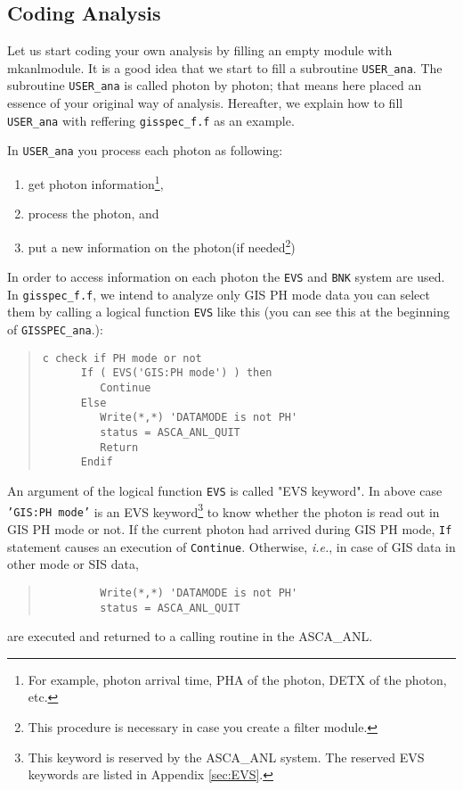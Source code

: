\subsection{Coding Analysis}
\label{sec:photon-info}
Let us start coding your own analysis
by filling an empty module with mkanlmodule.
It is a good idea
that we start to fill a subroutine {\tt USER\_ana}.
The subroutine {\tt USER\_ana} is called photon by photon;
that means here placed an essence of your original way of analysis.
Hereafter,
we explain how to fill {\tt USER\_ana}
with reffering {\tt gisspec\_f.f} as an example.

In {\tt USER\_ana}
you process each photon as following:
\begin{enumerate}
  \item get photon information\footnote{
  For example,
  photon arrival time, PHA of the photon, DETX of the photon, etc.
  },
  \item process the photon, and
  \item put a new information on the photon(if needed\footnote{
  This procedure is necessary in case you create a filter module.
  })
\end{enumerate}

In order to access information on each photon
the {\tt EVS} and {\tt BNK} system are used.
In {\tt gisspec\_f.f},
we intend to analyze only GIS PH mode data
you can select them by calling a logical function {\tt EVS}
like this (you can see this at the beginning of {\tt GISSPEC\_ana}.):
%
\begin{quote}\baselineskip 3.2mm\begin{verbatim}
c check if PH mode or not
      If ( EVS('GIS:PH mode') ) then
         Continue
      Else
         Write(*,*) 'DATAMODE is not PH'
         status = ASCA_ANL_QUIT
         Return
      Endif
\end{verbatim}\end{quote}

An argument of the logical function {\tt EVS} is called "EVS keyword".
In above case
{\tt 'GIS:PH mode'} is an EVS keyword\footnote{
This keyword is reserved by the ASCA\_ANL system.
The reserved EVS keywords are listed in Appendix \ref{sec:EVS}.
} 
to know whether the photon is read out in GIS PH mode or not.
If the current photon had arrived during GIS PH mode,
{\tt If} statement causes an execution of {\tt Continue}.
Otherwise,
{\em i.e.},
in case of GIS data in other mode or SIS data,
\begin{quote}\baselineskip 3.2mm\begin{verbatim}
         Write(*,*) 'DATAMODE is not PH'
         status = ASCA_ANL_QUIT
\end{verbatim}\end{quote}
are executed and returned to a calling routine in the ASCA\_ANL.

